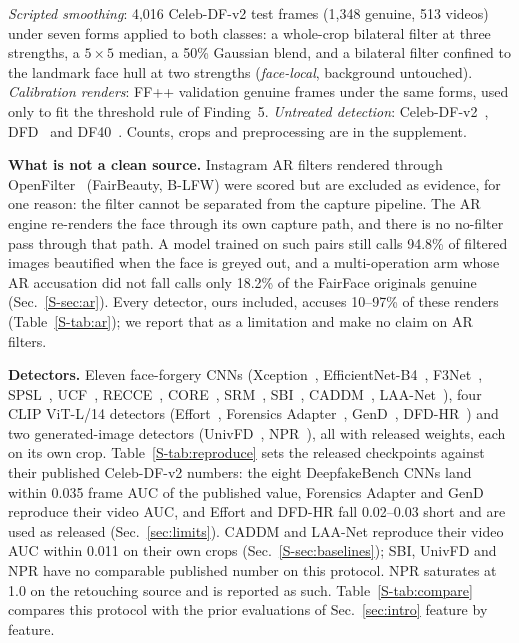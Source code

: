 \documentclass[conference]{IEEEtran}
\begin{document}
\emph{Scripted smoothing}: 4,016 Celeb-DF-v2 test frames (1,348 genuine, 513 videos)
under seven forms applied to both classes: a whole-crop bilateral filter at three strengths, a $5\times5$ median, a 50\%
Gaussian blend, and a bilateral filter confined to the landmark face hull at two strengths (\emph{face-local}, background
untouched). \emph{Calibration renders}: FF++ validation genuine frames under the same forms, used only to fit the threshold
rule of Finding~5. \emph{Untreated detection}: Celeb-DF-v2~\cite{celebdf}, DFD~\cite{dfd} and DF40~\cite{df40}. Counts,
crops and preprocessing are in the supplement.

\textbf{What is not a clean source.} Instagram AR filters rendered through OpenFilter~\cite{openfilter2022} (FairBeauty, B-LFW) were scored but are excluded as evidence, for one reason: the filter cannot be separated from the capture pipeline. The AR engine re-renders the face through its own capture path, and there
is no no-filter pass through that path. A model trained on such pairs still calls 94.8\% of filtered images beautified when the face is greyed out,
and a multi-operation arm whose AR accusation did not fall calls only 18.2\% of the FairFace originals genuine (Sec.~\ref{S-sec:ar}).
Every detector, ours included, accuses 10--97\% of these renders (Table~\ref{S-tab:ar}); we report that as a limitation and
make no claim on AR filters.

\textbf{Detectors.} Eleven face-forgery CNNs (Xception~\cite{xception}, EfficientNet-B4~\cite{efficientnet},
F3Net~\cite{f3net}, SPSL~\cite{spsl}, UCF~\cite{ucf}, RECCE~\cite{recce}, CORE~\cite{core}, SRM~\cite{srm}, SBI~\cite{sbi},
CADDM~\cite{caddm}, LAA-Net~\cite{laanet}), four CLIP ViT-L/14 detectors (Effort~\cite{effort}, Forensics
Adapter~\cite{forensicsadapter}, GenD~\cite{gend2026}, DFD-HR~\cite{dfdhr2026}) and two generated-image detectors
(UnivFD~\cite{univfd}, NPR~\cite{npr}), all with released weights, each on its own crop. Table~\ref{S-tab:reproduce} sets the released checkpoints against their published Celeb-DF-v2 numbers: the eight DeepfakeBench CNNs land within 0.035 frame AUC of the published value, Forensics Adapter and GenD reproduce their video AUC, and Effort and DFD-HR fall 0.02--0.03 short and are used as released (Sec.~\ref{sec:limits}). CADDM and LAA-Net reproduce their video AUC within 0.011 on their own crops (Sec.~\ref{S-sec:baselines}); SBI, UnivFD and NPR have no comparable published number on this protocol. NPR saturates at 1.0 on the
retouching source and is reported as such. Table~\ref{S-tab:compare} compares this protocol with the prior evaluations of Sec.~\ref{sec:intro} feature by feature.
\end{document}
